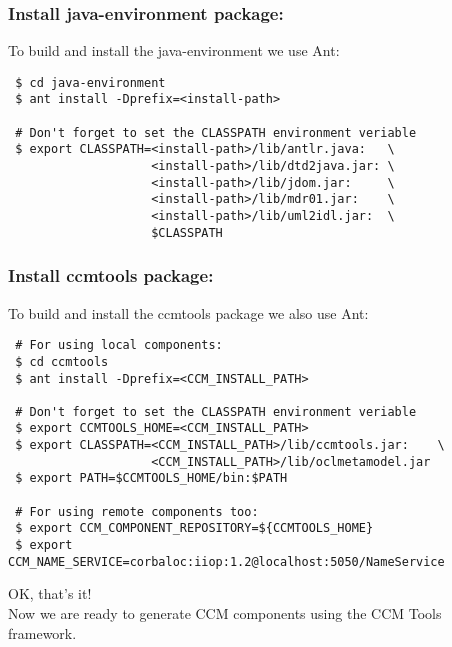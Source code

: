 \subsubsection{Install java-environment package:}
To build and install the java-environment we use Ant:
\begin{small}
\begin{verbatim}
 $ cd java-environment
 $ ant install -Dprefix=<install-path>
 
 # Don't forget to set the CLASSPATH environment veriable
 $ export CLASSPATH=<install-path>/lib/antlr.java:   \
                    <install-path>/lib/dtd2java.jar: \
                    <install-path>/lib/jdom.jar:     \     
                    <install-path>/lib/mdr01.jar:    \
                    <install-path>/lib/uml2idl.jar:  \
                    $CLASSPATH
\end{verbatim}
\end{small}



\subsubsection{Install ccmtools package:}
To build and install the  ccmtools package we also use Ant:
\begin{small}
\begin{verbatim}
 # For using local components: 
 $ cd ccmtools
 $ ant install -Dprefix=<CCM_INSTALL_PATH>

 # Don't forget to set the CLASSPATH environment veriable
 $ export CCMTOOLS_HOME=<CCM_INSTALL_PATH>
 $ export CLASSPATH=<CCM_INSTALL_PATH>/lib/ccmtools.jar:    \
                    <CCM_INSTALL_PATH>/lib/oclmetamodel.jar
 $ export PATH=$CCMTOOLS_HOME/bin:$PATH     

 # For using remote components too: 
 $ export CCM_COMPONENT_REPOSITORY=${CCMTOOLS_HOME} 
 $ export CCM_NAME_SERVICE=corbaloc:iiop:1.2@localhost:5050/NameService
\end{verbatim}
\end{small}
 
OK, that's it! \\
Now we are ready to generate CCM components using the CCM Tools framework.


